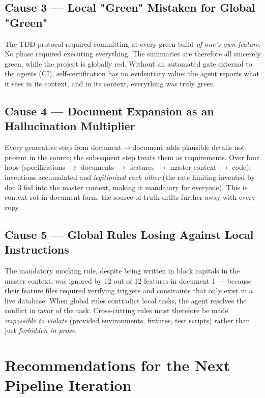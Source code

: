 \documentclass[11pt,a4paper]{article}
\begin{document}
	\subsection{Cause 3 --- Local "Green" Mistaken for Global "Green"}
	The TDD protocol required committing at every green build \emph{of one's own feature}. No phase required executing everything. The summaries are therefore all sincerely green, while the project is globally red. Without an automated gate external to the agents (CI), self-certification has no evidentiary value: the agent reports what it sees in its context, and in its context, everything was truly green.
	
	\subsection{Cause 4 --- Document Expansion as an Hallucination Multiplier}
	Every generative step from document$\to$document adds plausible details not present in the source; the subsequent step treats them as requirements. Over four hops (specifications $\to$ documents $\to$ features $\to$ master context $\to$ code), inventions accumulated and \emph{legitimized each other} (the rate limiting invented by doc 3 fed into the master context, making it mandatory for everyone). This is context rot in document form: the source of truth drifts further away with every copy.
	
	\subsection{Cause 5 --- Global Rules Losing Against Local Instructions}
	The mandatory mocking rule, despite being written in block capitals in the master context, was ignored by 12 out of 12 features in document 1 --- because their feature files required verifying triggers and constraints that only exist in a live database. When global rules contradict local tasks, the agent resolves the conflict in favor of the task. Cross-cutting rules must therefore be made \emph{impossible to violate} (provided environments, fixtures, test scripts) rather than just \emph{forbidden in prose}.
	
	\section{Recommendations for the Next Pipeline Iteration}
	
\end{document}
